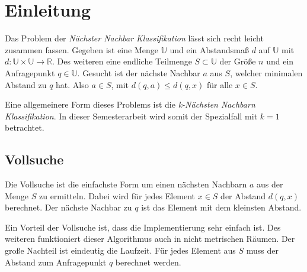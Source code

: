 \documentclass[deutsch,runningheads,a4paper]{llncs}
\begin{document}
  \tableofcontents
  \newpage
  
  \section{Einleitung}
    Das Problem der \textit{Nächster Nachbar Klassifikation} lässt sich recht leicht zusammen fassen. Gegeben ist eine
    Menge $\mathbb{U}$ und ein Abstandsmaß $d$ auf $\mathbb{U}$ mit $d: \mathbb{U} \times \mathbb{U} \to \mathbb{R}$.
    Des weiteren eine endliche Teilmenge $S \subset \mathbb{U}$ der Größe $n$ und ein Anfragepunkt $q \in \mathbb{U}$.
    Gesucht ist der nächste Nachbar $a$ aus $S$, welcher minimalen Abstand zu $q$ hat. Also $a \in S$, mit
    $d(q, a) \le d(q, x)$ f\"ur alle $x \in S$.
    
    Eine allgemeinere Form dieses Problems ist die \textit{k-Nächsten Nachbarn Klassifikation}. In dieser
    Semesterarbeit wird somit der Spezialfall mit $k = 1$ betrachtet.
  
  \subsection{Vollsuche}
    Die Vollsuche ist die einfachste Form um einen nächsten Nachbarn $a$ aus der Menge $S$ zu ermitteln.
    Dabei wird für jedes Element $x \in S$ der Abstand $d(q, x)$ berechnet. Der nächste Nachbar zu $q$ ist das Element
    mit dem kleinsten Abstand.
    
    Ein Vorteil der Vollsuche ist, dass die Implementierung sehr einfach ist. Des weiteren funktioniert dieser
    Algorithmus auch in nicht metrischen Räumen. Der große Nachteil ist eindeutig die Laufzeit. Für jedes Element aus
    $S$ muss der Abstand zum Anfragepunkt $q$ berechnet werden.
  
\end{document}
